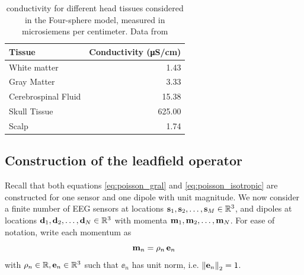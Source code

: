 \begin{table}[]
\centering
\begin{tabular}{lr}
\toprule
Tissue              & Conductivity (\unit{\micro \siemens/\cm}) \\ 
\midrule
White matter        & 1.43         \\
Gray Matter         & 3.33         \\
Cerebrospinal Fluid & 15.38        \\
Skull Tissue        & 625.00       \\
Scalp               & 1.74        \\
\bottomrule
\end{tabular}
\caption{conductivity for different head tissues considered in the Four-sphere model, measured in microsiemens per centimeter. Data from \cite{ramon2006influence}}
\label{tab:conductivity}
\end{table}

\subsection{Construction of the leadfield operator}

Recall that both equations \eqref{eq:poisson_gral} and \eqref{eq:poisson_isotropic} are constructed for one sensor and one dipole with unit magnitude.
%
We now consider a finite number of EEG sensors at locations $\mathbf{s}_1, \mathbf{s}_2, \dots, \mathbf{s}_M \in \mathbb{R}^3$, and dipoles at locations $\mathbf{d}_1, \mathbf{d}_2, \dots, \mathbf{d}_N \in \mathbb{R}^3$
with momenta $\mathbf{m}_1, \mathbf{m}_2, \dots, \mathbf{m}_N$.
%
For ease of notation, write each momentum as
\begin{equation}
    \mathbf{m}_n = \rho_n\, \mathbf{e}_n
\end{equation}
with $\rho_n\in \mathbb{R}, \mathbf{e}_n\in \mathbb{R}^3$ such that $\ee_n$ has unit norm, i.e. $\left\lVert \mathbf{e}_n \right\rVert_2 = 1$.

